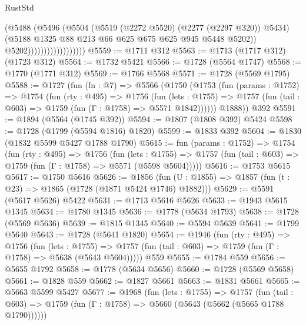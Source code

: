 \begin{lexlean}{RustStd}
\begin{coremodule}
{\begin{coremodule}
{{{{{{{{{{{{{                                    (@5488
                                      (@5496
                                        (@5504
                                          (@5519 (@2272 @5520) (@2277 (@2297 @320)) @5434)
                                          (@5188
                                            @1325
                                            @88
                                            @213
                                            @66
                                            @625
                                            @675
                                            @625
                                            @945
                                            @5448
                                            @5202))
                                        @5202))))))))))))))))))
@5559 := @1711 @312
@5563 := @1713 (@1717 @312) (@1723 @312)
@5564 := @1732 @5421
@5566 := @1728 (@5564 @1747)
@5568 := @1770 (@1771 @312)
@5569 := @1766 @5568
@5571 := @1728 (@5569 @1795)
@5588 := @1727
    (fun (fn : @7) =>
    @5566
      (@1750
        (@1753
          (fun (params : @1752) =>
          @1754
            (fun (rty : @495) =>
            @1756
              (fun (lets : @1755) =>
              @1757 (fun (tail : @603) => @1759 (fun (Γ : @1758) => @5571 @1842))))))
        @1888))
    @392
@5591 := @1894 (@5564 (@1745 @392))
@5594 := @1807 (@1808 @392) @5424
@5598 := @1728 (@1799 (@5594 @1816) @1820)
@5599 := @1833 @392
@5604 := @1830 (@1832 @5599 @5427 @1788 @1790)
@5615 := fun (params : @1752) =>
  @1754
    (fun (rty : @495) =>
    @1756
      (fun (lets : @1755) =>
      @1757 (fun (tail : @603) => @1759 (fun (Γ : @1758) => @5571 (@5598 @5604)))))
@5616 := @1753 @5615
@5617 := @1750 @5616
@5626 := @1856 (fun (U : @1855) => @1857 (fun (t : @23) => @1865 (@1728 (@1871 @5424 @1746) @1882)))
@5629 := @5591 (@5617 @5626) @5422
@5631 := @1713 @5616 @5626
@5633 := @1943 @5615 @1345
@5634 := @1780 @1345
@5636 := @1778 (@5634 @1793)
@5638 := @1728 (@5569 @5636)
@5639 := @1815 @1345
@5640 := @5594 @5639
@5641 := @1799 @5640
@5643 := @1728 (@5641 @1820)
@5654 := @1946
    (fun (rty : @495) =>
    @1756
      (fun (lets : @1755) =>
      @1757 (fun (tail : @603) => @1759 (fun (Γ : @1758) => @5638 (@5643 @5604)))))
    @559
@5655 := @1784 @559
@5656 := @5655 @1792
@5658 := @1778 (@5634 @5656)
@5660 := @1728 (@5569 @5658)
@5661 := @1828 @559
@5662 := @1827 @5661
@5663 := @1831 @5661
@5665 := @5663 @5599 @5427
@5677 := @1968
    (fun (lets : @1755) =>
    @1757
      (fun (tail : @603) => @1759 (fun (Γ : @1758) => @5660 (@5643 (@5662 (@5665 @1788 @1790))))))
}}}}}}}}}}}}}
\end{coremodule}}
\end{coremodule}
\end{lexlean}
